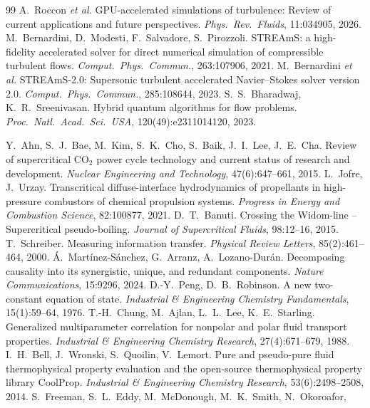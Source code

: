 \documentclass[11pt]{article}
\begin{document}
\begin{thebibliography}{99}
 A.\ Roccon \emph{et al.} GPU-accelerated simulations of turbulence: Review of current applications and future perspectives. \emph{Phys.\ Rev.\ Fluids}, 11:034905, 2026.
 M.\ Bernardini, D.\ Modesti, F.\ Salvadore, S.\ Pirozzoli. STREAmS: a high-fidelity accelerated solver for direct numerical simulation of compressible turbulent flows. \emph{Comput.\ Phys.\ Commun.}, 263:107906, 2021.
 M.\ Bernardini \emph{et al.} STREAmS-2.0: Supersonic turbulent accelerated Navier--Stokes solver version 2.0. \emph{Comput.\ Phys.\ Commun.}, 285:108644, 2023.
 S.\ S.\ Bharadwaj, K.\ R.\ Sreenivasan. Hybrid quantum algorithms for flow problems. \emph{Proc.\ Natl.\ Acad.\ Sci.\ USA}, 120(49):e2311014120, 2023.
 Y.\ Ahn, S.\ J.\ Bae, M.\ Kim, S.\ K.\ Cho, S.\ Baik, J.\ I.\ Lee, J.\ E.\ Cha.
Review of supercritical CO$_2$ power cycle technology and current status of research and
development. \emph{Nuclear Engineering and Technology}, 47(6):647--661, 2015.
 L.\ Jofre, J.\ Urzay. Transcritical diffuse-interface hydrodynamics
of propellants in high-pressure combustors of chemical propulsion systems. \emph{Progress
in Energy and Combustion Science}, 82:100877, 2021.
 D.\ T.\ Banuti. Crossing the Widom-line -- Supercritical pseudo-boiling.
\emph{Journal of Supercritical Fluids}, 98:12--16, 2015.
 T.\ Schreiber. Measuring information transfer. \emph{Physical Review
Letters}, 85(2):461--464, 2000.
 \'A.\ Mart\'inez-S\'anchez, G.\ Arranz, A.\ Lozano-Dur\'an.
Decomposing causality into its synergistic, unique, and redundant components. \emph{Nature
Communications}, 15:9296, 2024.
 D.-Y.\ Peng, D.\ B.\ Robinson. A new two-constant equation of
state. \emph{Industrial \& Engineering Chemistry Fundamentals}, 15(1):59--64, 1976.
 T.-H.\ Chung, M.\ Ajlan, L.\ L.\ Lee, K.\ E.\ Starling. Generalized
multiparameter correlation for nonpolar and polar fluid transport properties.
\emph{Industrial \& Engineering Chemistry Research}, 27(4):671--679, 1988.
 I.\ H.\ Bell, J.\ Wronski, S.\ Quoilin, V.\ Lemort. Pure and
pseudo-pure fluid thermophysical property evaluation and the open-source thermophysical
property library CoolProp. \emph{Industrial \& Engineering Chemistry Research},
53(6):2498--2508, 2014.
 S.\ Freeman, S.\ L.\ Eddy, M.\ McDonough, M.\ K.\ Smith, N.\ Okoroafor,

\end{thebibliography}
\end{document}
